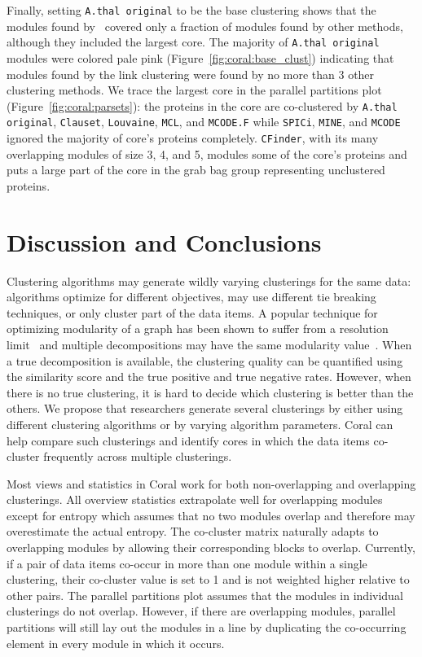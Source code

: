 \documentclass[12pt]{cmuthesis}
\newcommand\Coral{Coral\xspace}
\begin{document}

  Finally, setting \texttt{A.thal original} to be the base clustering shows that the modules found by~\cite{Vidal2011} covered only a fraction of modules found by other methods, although they included the largest core. The majority of \texttt{A.thal original} modules were colored pale pink  (Figure~\ref{fig:coral:base_clust}) indicating that modules found by the link clustering were found by no more than 3 other clustering methods. We trace the largest core in the parallel partitions plot (Figure~\ref{fig:coral:parsets}): the proteins in the core are co-clustered by \texttt{A.thal original}, \texttt{Clauset}, \texttt{Louvaine}, \texttt{MCL}, and \texttt{MCODE.F} while \texttt{SPICi}, \texttt{MINE}, and \texttt{MCODE} ignored the majority of core's proteins completely. \texttt{CFinder}, with its many overlapping modules of size 3, 4, and 5, modules some of the core's proteins and puts a large part of the core in the grab bag group representing unclustered proteins.

\section{Discussion and Conclusions}

  Clustering algorithms may generate wildly varying clusterings for the same data: algorithms optimize for different objectives, may use different tie breaking techniques, or only cluster part of the data items. A popular technique for optimizing modularity of a graph has been shown to suffer from a resolution limit~\cite{Fortunato2006} and multiple decompositions may have the same modularity value~\cite{Duggal2010}. When a true decomposition is available, the clustering quality can be quantified using the similarity score and the true positive and true negative rates. However, when there is no true clustering, it is hard to decide which clustering is better than the others. We propose that researchers generate several clusterings by either using different clustering algorithms or by varying algorithm parameters. \Coral can help compare such clusterings and identify cores in which the data items co-cluster frequently across multiple clusterings.

  Most views and statistics in \Coral work for both non-overlapping and overlapping clusterings. All overview statistics extrapolate well for overlapping modules except for entropy which assumes that no two modules overlap and therefore may overestimate the actual entropy. The co-cluster matrix naturally adapts to overlapping modules by allowing their corresponding blocks to overlap. Currently, if a pair of data items co-occur in more than one module within a single clustering, their co-cluster value is set to 1 and is not weighted higher relative to other pairs. The parallel partitions plot assumes that the modules in individual clusterings do not overlap. However, if there are overlapping modules, parallel partitions will still lay out the modules in a line by duplicating the co-occurring element in every module in which it occurs.
\end{document}
